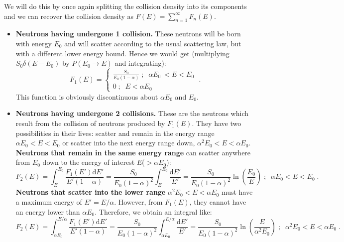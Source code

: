 We will do this by once again splitting the collision density into its components and we can recover the collision density as $F(E) = \sum^\infty_{n=1}F_n(E)$.
\begin{itemize}
    \item \textbf{Neutrons having undergone 1 collision.} These neutrons will be born with energy $E_0$ and will scatter according to the usual scattering law, but with a different lower energy bound. Hence we would get (multiplying $S_0\delta(E-E_0)$ by $P(E_0\rightarrow E)$ and integrating):
    \begin{equation*}
        F_1(E) =  \left\{\begin{array}{ll}
      \frac{S_0 }{E_0(1-\alpha)}\;\mathrm{;}\;\; \alpha E_0\ < E < E_0\\
      0\;\mathrm{;}\;\; E < \alpha E_0
      \end{array} 
      \right.\;\mathrm{.}
    \end{equation*}
    This function is obviously discontinuous about $\alpha E_0$ and $E_0$.
    \item \textbf{Neutrons having undergone 2 collisions.} These are the neutrons which result from the collision of neutrons produced by $F_1(E)$. They have two possibilities in their lives: scatter and remain in the energy range $\alpha E_0 < E < E_0$ or scatter into the next energy range down, $\alpha^2 E_0 < E < \alpha E_0$. 
    \textbf{Neutrons that remain in the same energy range} can scatter anywhere from $E_0$ down to the energy of interest $E$($>\alpha E_0$):
    \begin{equation*}
        F_2(E) = \int^{E_0}_E\frac{F_1(E')\mathrm{d}E'}{E'(1-\alpha)} = \frac{S_0}{E_0(1-\alpha)^2}\int^{E_0}_E\frac{\mathrm{d}E'}{E'} = \frac{S_0}{E_0(1-\alpha)^2}\ln\left(\frac{E_0}{E}\right)\;\mathrm{;}\;\;\alpha E_0 < E < E_0\;\mathrm{.}
    \end{equation*}
    \textbf{Neutrons that scatter into the lower range} $\alpha^2 E_0 < E < \alpha E_0$ must have a maximum energy of $E' = E/\alpha$. However, from $F_1(E)$, they cannot have an energy lower than $\alpha E_0$. Therefore, we obtain an integral like:
    \begin{equation*}
        F_2(E) = \int^{E/\alpha}_{\alpha E_0}\frac{F_1(E')\mathrm{d}E'}{E'(1-\alpha)} = \frac{S_0}{E_0(1-\alpha)^2}\int^{E/\alpha}_{\alpha E_0}\frac{\mathrm{d}E'}{E'} = \frac{S_0}{E_0(1-\alpha)^2}\ln\left(\frac{E}{\alpha^2 E_0}\right)\;\mathrm{;}\;\;\alpha^2 E_0 < E < \alpha E_0\;\mathrm{.}
    \end{equation*}


\end{itemize}

